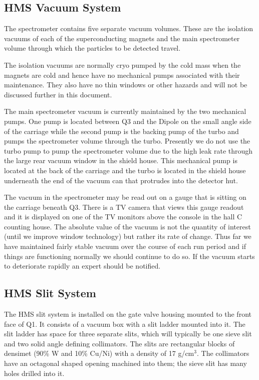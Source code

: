 \subsection{HMS Vacuum System}

	The spectrometer contains five separate vacuum volumes.
These are the isolation vacuums of each of the superconducting
magnets and the main spectrometer volume through which the particles
to be detected travel.

The isolation vacuums are normally cryo pumped by the cold mass when the
magnets are cold and hence have no mechanical pumps
associated with their maintenance. They also have no thin
windows or other hazards and will not be discussed further in this document.

The main spectrometer vacuum
is currently maintained by the two mechanical pumps.
One pump is located between Q3 and the Dipole on the small angle
side of the carriage while the second pump is the backing
pump of the turbo and pumps the spectrometer volume through the turbo.
Presently we do not use the turbo pump to pump the spectrometer volume due to
the high leak rate through the large rear vacuum window in the shield house.
This mechanical pump is located
at the back of the carriage and the turbo is located in the shield house
underneath the end of the vacuum can that protrudes into the detector hut.

The vacuum in the spectrometer may be read out on a gauge that is sitting on the
carriage beneath Q3. There is a TV camera that views this gauge readout and
it is displayed on one of the TV monitors above the console in the hall
C counting house. The absolute value of the vacuum is not the quantity
of interest (until we improve window technology) but rather its rate of change.
Thus far we have maintained fairly stable vacuum over the course of each run
period and if things are functioning normally we should continue to do so.
If the vacuum starts to deteriorate rapidly an expert should be notified.



\subsection{HMS Slit System}
\label{sec:hms_slit}

The HMS slit system is installed on the gate valve housing mounted to the
front face of Q1. It consists of a vacuum box with a slit ladder
mounted into it. The slit ladder has space for three separate slits,
which will typically be one sieve slit and two solid angle defining collimators.
The slits are rectangular blocks of densimet (90\% W and 10\% Cu/Ni)
with a density of 17 g/cm$^3$. The collimators have an octagonal shaped
opening machined into them; the sieve slit has many holes drilled
into it.

